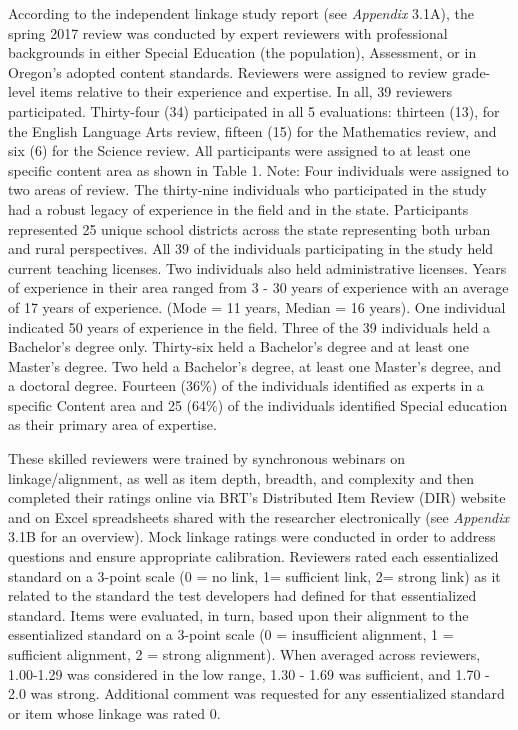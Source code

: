 \documentclass[]{article}
\begin{document}
According to the independent linkage study report (see \emph{Appendix}
3.1A), the spring 2017 review was conducted by expert reviewers with
professional backgrounds in either Special Education (the population),
Assessment, or in Oregon's adopted content standards. Reviewers were
assigned to review grade-level items relative to their experience and
expertise. In all, 39 reviewers participated. Thirty-four (34)
participated in all 5 evaluations: thirteen (13), for the English
Language Arts review, fifteen (15) for the Mathematics review, and six
(6) for the Science review. All participants were assigned to at least
one specific content area as shown in Table 1. Note: Four individuals
were assigned to two areas of review. The thirty-nine individuals who
participated in the study had a robust legacy of experience in the field
and in the state. Participants represented 25 unique school districts
across the state representing both urban and rural perspectives. All 39
of the individuals participating in the study held current teaching
licenses. Two individuals also held administrative licenses. Years of
experience in their area ranged from 3 - 30 years of experience with an
average of 17 years of experience. (Mode = 11 years, Median = 16 years).
One individual indicated 50 years of experience in the field. Three of
the 39 individuals held a Bachelor's degree only. Thirty-six held a
Bachelor's degree and at least one Master's degree. Two held a
Bachelor's degree, at least one Master's degree, and a doctoral degree.
Fourteen (36\%) of the individuals identified as experts in a specific
Content area and 25 (64\%) of the individuals identified Special
education as their primary area of expertise.

These skilled reviewers were trained by synchronous webinars on
linkage/alignment, as well as item depth, breadth, and complexity and
then completed their ratings online via BRT's Distributed Item Review
(DIR) website and on Excel spreadsheets shared with the researcher
electronically (see \emph{Appendix} 3.1B for an overview). Mock linkage
ratings were conducted in order to address questions and ensure
appropriate calibration. Reviewers rated each essentialized standard on
a 3-point scale (0 = no link, 1= sufficient link, 2= strong link) as it
related to the standard the test developers had defined for that
essentialized standard. Items were evaluated, in turn, based upon their
alignment to the essentialized standard on a 3-point scale (0 =
insufficient alignment, 1 = sufficient alignment, 2 = strong alignment).
When averaged across reviewers, 1.00-1.29 was considered in the low
range, 1.30 - 1.69 was sufficient, and 1.70 - 2.0 was strong. Additional
comment was requested for any essentialized standard or item whose
linkage was rated 0.
\end{document}
